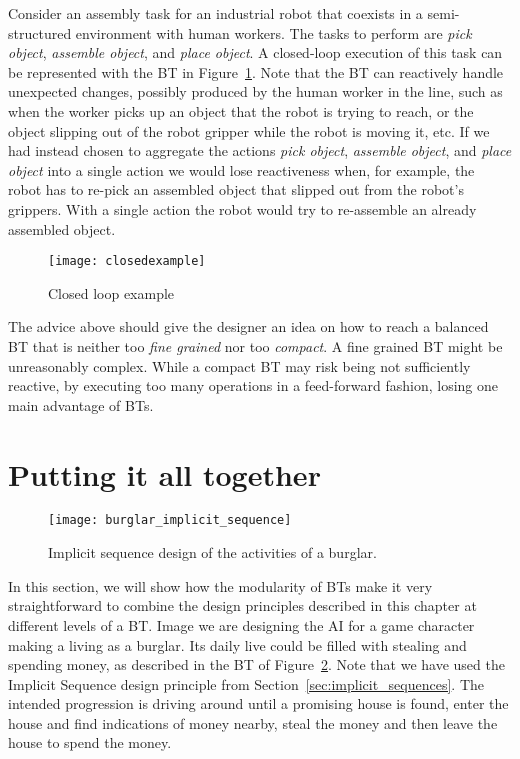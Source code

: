 Consider an assembly task for an industrial robot that coexists in a semi-structured environment with human workers. The tasks to perform are \emph{pick object}, \emph{assemble object}, and \emph{place object}. A closed-loop execution of this task can be represented with the BT in Figure~\ref{design:fig:closed}. Note that the BT can reactively handle  unexpected changes, possibly produced by the human worker in the line, such as when the worker picks up an object that the robot is trying to reach, or the object slipping out of the robot gripper while the robot is moving it, etc. If we had instead chosen to aggregate the actions \emph{pick object}, \emph{assemble object}, and \emph{place object} into a single action 
we would lose reactiveness when, for example, the robot has to re-pick an assembled object that slipped out from the robot's grippers. With a single action the robot would try to re-assemble an already assembled object. 
\begin{figure}[h]
\centering
  \texttt{[image: closedexample]}
\caption{Closed loop example}
\label{design:fig:closed}
\end{figure}
%

The advice above should give the designer an idea on how to reach a balanced BT that is neither too \emph{fine grained} nor too \emph{compact}. A fine grained BT might be unreasonably complex. While a compact BT may risk being not sufficiently reactive, by executing too many operations in a feed-forward fashion, losing one main advantage of BTs.



\section{Putting it all together}
\label{design:sec:combinations}

\begin{figure}[h]
\centering
  \texttt{[image: burglar\_implicit\_sequence]}
\caption{Implicit sequence design of the activities of a burglar.}
\label{design:fig:burglar_implicit_sequence}
\end{figure}


In this section, we will show how the modularity of BTs make it very straightforward to combine the design principles described in this chapter at different levels of a BT.
Image we are designing the AI for a game character making a living as a burglar.
Its daily live could be filled with stealing and spending money, as described in the BT of Figure~\ref{design:fig:burglar_implicit_sequence}.
Note that we have used the Implicit Sequence design principle from Section~\ref{sec:implicit_sequences}.
The intended progression is driving around until a promising house is found, enter the house and find indications of money nearby,
steal the money and then leave the house to spend the money.

